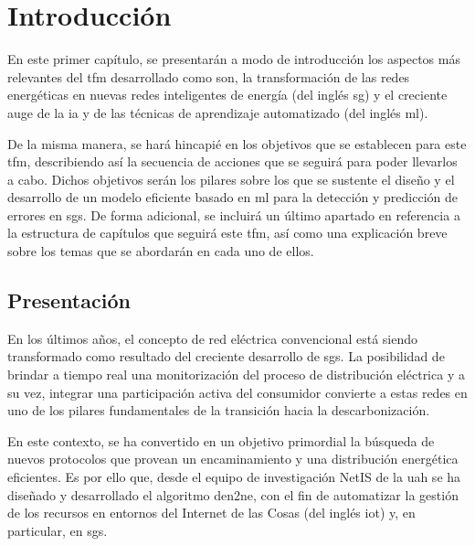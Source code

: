 
\chapter{Introducción}
\label{ch:intro}

En este primer capítulo, se presentarán a modo de introducción los aspectos más relevantes del \gls{tfm} desarrollado como son, la transformación de las redes energéticas en nuevas redes inteligentes de energía (del inglés \gls{sg}) y el creciente auge de la \gls{ia} y de las técnicas de aprendizaje automatizado (del inglés \gls{ml}).

\vspace{3mm}

De la misma manera, se hará hincapié en los objetivos que se establecen para este \gls{tfm}, describiendo así la secuencia de acciones que se seguirá para poder llevarlos a cabo. Dichos objetivos serán los pilares sobre los que se sustente el diseño y el desarrollo de un modelo eficiente basado en \gls{ml} para la detección y predicción de errores en \gls{sgs}. De forma adicional, se incluirá un último apartado en referencia a la estructura de capítulos que seguirá este \gls{tfm}, así como una explicación breve sobre los temas que se abordarán en cada uno de ellos.


\section{Presentación}
\label{sec:presentacion}

En los últimos años, el concepto de red eléctrica convencional está siendo transformado como resultado del creciente desarrollo de \gls{sgs}. La posibilidad de brindar a tiempo real una monitorización del proceso de distribución eléctrica y a su vez, integrar una participación activa del consumidor convierte a estas redes en uno de los pilares fundamentales de la
transición hacia la descarbonización. 

\vspace{3mm}

En este contexto, se ha convertido en un objetivo primordial la búsqueda de nuevos protocolos que provean un encaminamiento y una distribución energética eficientes. Es por ello que, desde el equipo de investigación NetIS de la \gls{uah} se ha diseñado y desarrollado el algoritmo \gls{den2ne}, con el fin de automatizar la gestión de los recursos en entornos del Internet de las Cosas (del inglés \gls{iot}) y, en particular, en \gls{sgs}.

\vspace{3mm}


